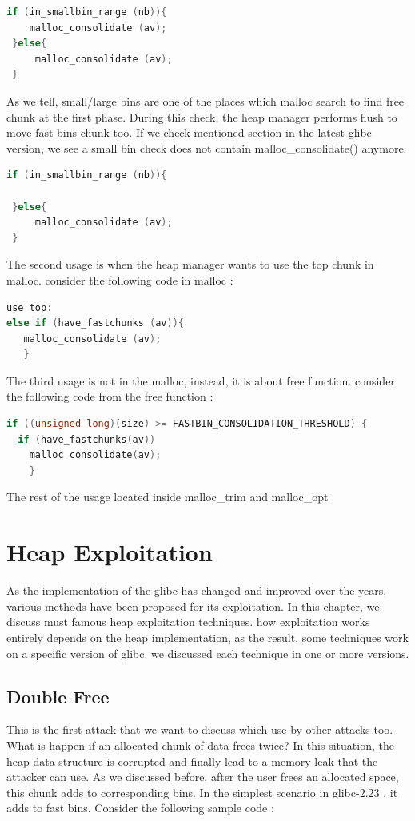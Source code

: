 \documentclass{masterthesis}
\newcommand*\libc{glibc}
\newcommand*\fb{fast bins}
\begin{document}
\begin{lstlisting}[language=c,frame=tlrb]
 if (in_smallbin_range (nb)){
 	malloc_consolidate (av);
 }else{
	 malloc_consolidate (av);
 }
\end{lstlisting}

As we tell, small/large bins are one of the places which malloc search to find free chunk at the first phase. During this check, the heap manager performs flush to move \fb{} chunk too. If we check mentioned section in the latest \libc{} version, we see a small bin check does not contain malloc\_consolidate() anymore.

\begin{lstlisting}[language=c,frame=tlrb]
 if (in_smallbin_range (nb)){
 	 
 }else{
	 malloc_consolidate (av);
 }
\end{lstlisting}

The second usage is when the heap manager wants to use the top chunk in malloc. consider the following code in malloc :

\begin{lstlisting}[language=c,frame=tlrb]
use_top:
else if (have_fastchunks (av)){
   malloc_consolidate (av);
   }
\end{lstlisting}

The third usage is not in the malloc, instead, it is about free function. consider the following code from the free function :

\begin{lstlisting}[language=c,frame=tlrb]
if ((unsigned long)(size) >= FASTBIN_CONSOLIDATION_THRESHOLD) {
  if (have_fastchunks(av))
	malloc_consolidate(av);
	}
\end{lstlisting}

The rest of the usage located inside malloc\_trim and malloc\_opt

\chapter{Heap Exploitation }

As the implementation of the \libc{} has changed and improved over the years, various methods have been proposed for its exploitation. In this chapter, we discuss must famous heap exploitation techniques. how exploitation works entirely depends on the heap implementation, as the result, some techniques work on a specific version of \libc{}. we discussed each technique in one or more versions.

\section{Double Free}
This is the first attack that we want to discuss which use by other attacks too. What is happen if an allocated chunk of data frees twice? In this situation, the heap data structure is corrupted and finally lead to a memory leak that the attacker can use. As we discussed before, after the user frees an allocated space, this chunk adds to corresponding bins. In the simplest scenario in \libc{-2.23} , it adds to fast bins. Consider the following sample code :
\end{document}
